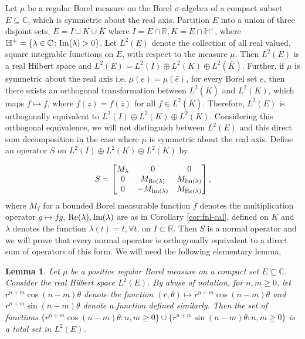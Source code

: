 \documentclass[12pt,a4paper,twoside]{article}
\numberwithin{equation}{section}
\theoremstyle{definition}  %
\theoremstyle{plain}  %
\newtheorem{lem}[defn]{Lemma}
\theoremstyle{remark} %
\begin{document}
   Let $\mu$ be a regular Borel measure on the Borel $\sigma$-algebra of a compact subset $E \subseteq \mathbb{C}$, which is symmetric about the real axis. Partition $E$ into a union of three disjoint sets, $E= I \cup K \cup \bar{K}$ where $I = E \cap \mathbb{R}, K = E \cap \mathbb{H^{+}}$, where $\mathbb{H^{+}} = \{\lambda \in \mathbb{C} \colon \textnormal{Im}(\lambda) > 0\}$. Let $L^{2}(E)$ denote the collection of all real valued, square integrable functions on $E$, with respect to the measure $\mu$. Then $L^{2}(E)$ is a real Hilbert space and $L^{2}(E) = L^{2}(I) \oplus L^{2}(K) \oplus L^{2}(\bar{K})$. Further, if $\mu$ is symmetric about the real axis i.e. $\mu(e)= \mu(\bar{e})$, for every Borel set $e$, then there exists an orthogonal transformation between $L^{2}(\bar{K})$ and $L^{2}(K)$, which maps $f \mapsto \bar{f}$, where $\bar{f}(z)= f(\bar{z})$ for all $f \in L^{2}(\bar{K})$. Therefore, $L^{2}(E)$ is orthogonally equivalent to $L^{2}(I) \oplus L^{2}(K) \oplus L^{2}(K)$. Considering this orthogonal equivalence, we will not distinguish between $L^{2}(E)$ and this direct sum decomposition in the case where $\mu$ is symmetric about the real axis. Define an operator $S$ on  $L^{2}(I) \oplus L^{2}(K) \oplus L^{2}(K)$ by

\begin{equation}
  \label{eq:basic-operator}
  S = \begin{bmatrix}
        M_{\lambda} &           0            &       0                \\
            0     & M_{\textnormal{Re}(\lambda)} & M_{\textnormal{Im}(\lambda)} \\
            0     &-M_{\textnormal{Im}(\lambda)} & M_{\textnormal{Re}(\lambda)}
      \end{bmatrix},
\end{equation}
where $M_{f}$ for a bounded Borel measurable function $f$ denotes
the multiplication operator $g \mapsto fg$,
$\textnormal{Re}(\lambda), \textnormal{Im}(\lambda)$ are as in
Corollary \ref{cor:fnl-cal}, defined on $K$ and $\lambda$ denotes
the function $\lambda(t) = t, \forall t$, on $I \subset \mathbb{R}$.
Then $S$ is a normal operator and we  will prove that every normal
operator is orthogonally equivalent to a direct sum of operators of
this form. We will need the following elementary lemma,
% 
% 
\begin{lem} \label{lem:total-set}
  Let $\mu$ be a positive regular Borel measure on a compact set $E \subseteq \mathbb{C}$. Consider the real Hilbert space $L^{2}(E)$. By abuse of notation, for $n,m \geq 0$, let $r^{n+m}\cos (n-m)\theta$ denote the function $(r, \theta) \mapsto r^{n+m}\cos (n-m)\theta$ and $r^{n+m}\sin (n-m)\theta$ denote a function defined similarly. Then the set of functions $\{r^{n+m}\cos (n-m)\theta : n, m \geq 0 \} \cup \{r^{n+m}\sin (n-m)\theta: n, m \geq 0\}$ is a total set in $L^{2}(E)$.
\end{lem}
\end{document}
